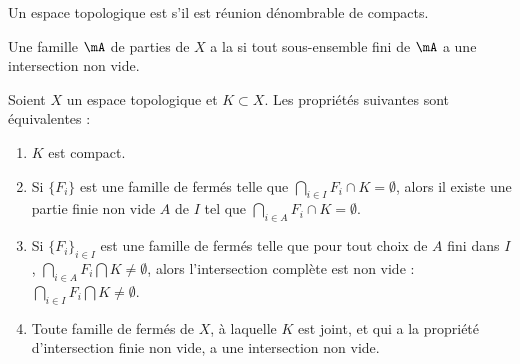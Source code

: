 \begin{definition}      \label{DefFCGBooLpnSAK}
    Un espace topologique est  s'il est réunion dénombrable de compacts.
\end{definition}

\begin{definition}
    Une famille \( \mA\) de parties de \( X\) a la  si tout sous-ensemble fini de \( \mA\) a une intersection non vide.
\end{definition}

\begin{proposition}\label{PropXKUMiCj}
    Soient \( X\) un espace topologique et \( K\subset X\). Les propriétés suivantes sont équivalentes :
    \begin{enumerate}
        \item\label{ItemXYmGHFai}
            \( K\) est compact.
        \item\label{ItemXYmGHFaii}
            Si \( \{ F_i \}\) est une famille de fermés telle que \( \bigcap_{i\in I}F_i \cap K =\emptyset\), alors il existe une partie finie non vide \( A\) de \( I\) tel que \( \bigcap_{i\in A}F_i \cap K =\emptyset\).
        \item\label{ItemXYmGHFaiii}
            Si \( \{ F_i \}_{i\in I}\) est une famille de fermés telle que pour tout choix de \( A\) fini dans \( I\), \( \bigcap_{i\in A}F_i \bigcap K \neq\emptyset\), alors l'intersection complète est non vide : \( \bigcap_{i\in I}F_i \bigcap K\neq\emptyset\).
        \item\label{ItemXYmGHFaiv}
            Toute famille de fermés de \( X \), à laquelle \( K \) est joint, et qui a la propriété d'intersection finie non vide, a une intersection non vide.
    \end{enumerate}
\end{proposition}

